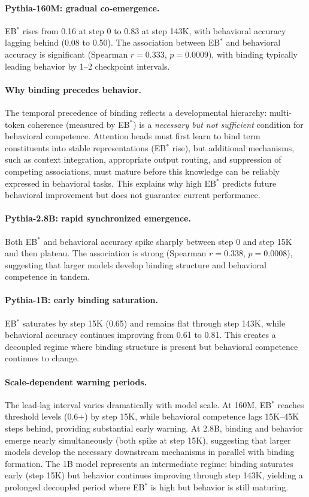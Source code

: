 \documentclass[10pt]{article} %
\begin{document}
\paragraph{Pythia-160M: gradual co-emergence.}
EB$^*$ rises from 0.16 at step 0 to 0.83 at step 143K, with behavioral accuracy lagging behind (0.08 to 0.50).
The association between EB$^*$ and behavioral accuracy is significant (Spearman $r=0.333$, $p=0.0009$), with binding typically leading behavior by 1--2 checkpoint intervals.

\paragraph{Why binding precedes behavior.}
The temporal precedence of binding reflects a developmental hierarchy: multi-token coherence (measured by EB$^*$) is a \emph{necessary but not sufficient} condition for behavioral competence.
Attention heads must first learn to bind term constituents into stable representations (EB$^*$ rise), but additional mechanisms, such as context integration, appropriate output routing, and suppression of competing associations, must mature before this knowledge can be reliably expressed in behavioral tasks.
This explains why high EB$^*$ predicts future behavioral improvement but does not guarantee current performance.

\paragraph{Pythia-2.8B: rapid synchronized emergence.}
Both EB$^*$ and behavioral accuracy spike sharply between step 0 and step 15K and then plateau.
The association is strong (Spearman $r=0.338$, $p=0.0008$), suggesting that larger models develop binding structure and behavioral competence in tandem.

\paragraph{Pythia-1B: early binding saturation.}
EB$^*$ saturates by step 15K (0.65) and remains flat through step 143K, while behavioral accuracy continues improving from 0.61 to 0.81.
This creates a decoupled regime where binding structure is present but behavioral competence continues to change.

\paragraph{Scale-dependent warning periods.}
The lead-lag interval varies dramatically with model scale.
At 160M, EB$^*$ reaches threshold levels (0.6+) by step 15K, while behavioral competence lags 15K--45K steps behind, providing substantial early warning.
At 2.8B, binding and behavior emerge nearly simultaneously (both spike at step 15K), suggesting that larger models develop the necessary downstream mechanisms in parallel with binding formation.
The 1B model represents an intermediate regime: binding saturates early (step 15K) but behavior continues improving through step 143K, yielding a prolonged decoupled period where EB$^*$ is high but behavior is still maturing.
\end{document}
